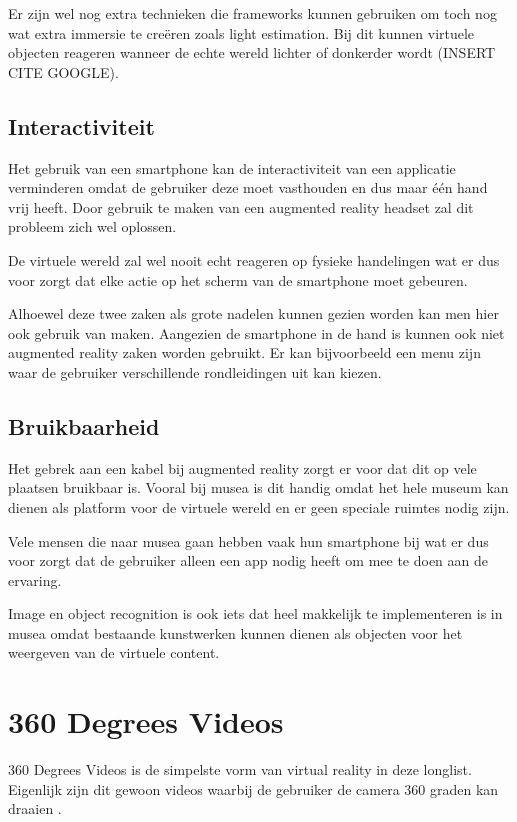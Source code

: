 Er zijn wel nog extra technieken die frameworks kunnen gebruiken om toch nog wat extra immersie te creëren zoals light estimation. Bij dit kunnen virtuele objecten reageren wanneer de echte wereld lichter of donkerder wordt (INSERT CITE GOOGLE).

\subsection{Interactiviteit}
Het gebruik van een smartphone kan de interactiviteit van een applicatie verminderen omdat de gebruiker deze moet vasthouden en dus maar één hand vrij heeft. Door gebruik te maken van een augmented reality headset zal dit probleem zich wel oplossen.

De virtuele wereld zal wel nooit echt reageren op fysieke handelingen wat er dus voor zorgt dat elke actie op het scherm van de smartphone moet gebeuren.

Alhoewel deze twee zaken als grote nadelen kunnen gezien worden kan men hier ook gebruik van maken. Aangezien de smartphone in de hand is kunnen ook niet augmented reality zaken worden gebruikt. Er kan bijvoorbeeld een menu zijn waar de gebruiker verschillende rondleidingen uit kan kiezen.

\subsection{Bruikbaarheid}
Het gebrek aan een kabel bij augmented reality zorgt er voor dat dit op vele plaatsen bruikbaar is. Vooral bij musea is dit handig omdat het hele museum kan dienen als platform voor de virtuele wereld en er geen speciale ruimtes nodig zijn.

Vele mensen die naar musea gaan hebben vaak hun smartphone bij wat er dus voor zorgt dat de gebruiker alleen een app nodig heeft om mee te doen aan de ervaring.

Image en object recognition is ook iets dat heel makkelijk te implementeren is in musea omdat bestaande kunstwerken kunnen dienen als objecten voor het weergeven van de virtuele content.

\section{360 Degrees Videos}
360 Degrees Videos is de simpelste vorm van virtual reality in deze longlist. Eigenlijk zijn dit gewoon videos waarbij de gebruiker de camera 360 graden kan draaien \autocite{Hosseini2016}.


